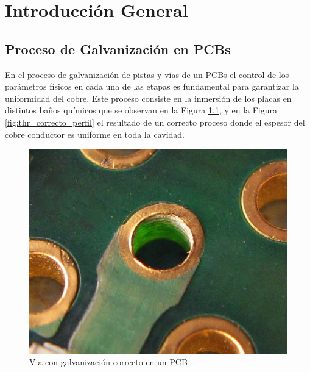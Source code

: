 
\chapter{Introducción General} %

\label{Chapter1} %
\label{IntroGeneral}


\newcommand{\keyword}[1]{\textbf{#1}}
\newcommand{\tabhead}[1]{\textbf{#1}}
\newcommand{\code}[1]{\texttt{#1}}
\newcommand{\file}[1]{\texttt{\bfseries#1}}
\newcommand{\option}[1]{\texttt{\itshape#1}}
\newcommand{\grados}{$^{\circ}$}



\section{Proceso de Galvanización en PCBs}

En el proceso de galvanización de pistas y vías de un PCBs el control de los parámetros físicos en cada una de las etapas es fundamental para garantizar la uniformidad del cobre. Este proceso consiste en la inmersión de los placas en distintos baños químicos que se observan en la Figura \ref{fig:thr_correcto}, y en la Figura \ref{fig:thr_correcto_perfil} el resultado de un correcto proceso donde el espesor del cobre conductor es uniforme en toda la cavidad.

\begin{figure}[h]
	\centering
	\includegraphics[width=.5\textwidth]{Figures/through_hole_correcto}
	\caption{Via con galvanización correcto en un PCB}
	\label{fig:thr_correcto}
\end{figure}

